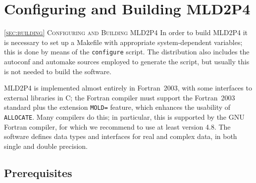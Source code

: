 \section{Configuring and Building MLD2P4\label{sec:building}}
         {\textsc{\ref{sec:building} Configuring and Building MLD2P4}}
In order to build MLD2P4 it is necessary to set up a Makefile with appropriate
system-dependent variables; this is done by means of the \verb|configure|
script. The distribution also includes the autoconf and automake
sources employed to generate the script, but usually this is not needed
to build the software. 

MLD2P4 is implemented almost entirely in Fortran~2003, with some
interfaces to external libraries in C; the Fortran compiler
must support the Fortran~2003 standard plus the extension \verb|MOLD=|
feature, which enhances the usability of \verb|ALLOCATE|. 
Many compilers do this; in particular, this is
supported by the GNU Fortran compiler, for which we 
recommend to use at least version 4.8. 
The software defines data types and interfaces for
real and complex data, in both single and double precision. 

\subsection{Prerequisites}


